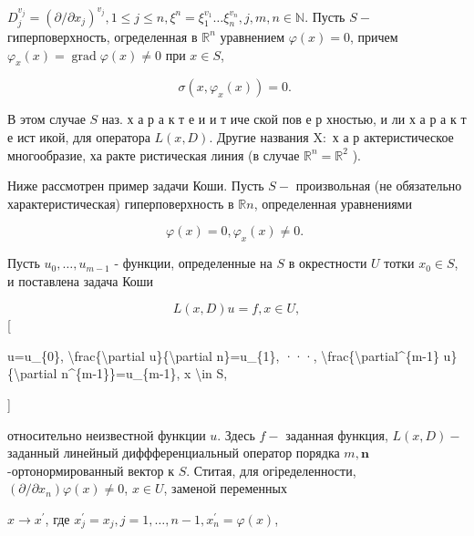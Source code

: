 \documentclass[10pt]{article}
\begin{document}
$D_{j}^{v_{j}}=\left(\partial / \partial x_{j}\right)^{v_{j}}, 1 \leqslant j \leqslant n, \xi^{n}=\xi_{1}^{v_{1}} \ldots \xi_{n}^{v_{n}}, j, m, n \in \mathbb{N}$. Пусть $S-$ гиперповерхность, огределенная в $\mathbb{R}^{n}$ уравнением $\varphi(x)=0$, причем $\varphi_{x}(x)=\operatorname{grad} \varphi(x) \neq 0$ при $x \in S$,



\[

\sigma\left(x, \varphi_{x}(x)\right)=0 \text {. }

\]



В этом случае $S$ наз. х а р а к т е и и т иче ской пов е р хностью, и ли х а р а к т е ист икой, для оператора $L(x, D)$. Другие названия $\mathrm{X}:$ х а р актеристическое многообразие, ха ракте ристическая линия (в случае $\mathbb{R}^{n}=\mathbb{R}^{2}$ ).



Ниже рассмотрен пример задачи Коши. Пусть $S-$ произвольная (не обязательно характеристическая) гиперповерхность в $\mathbb{R} n$, определенная уравнениями



\[

\varphi(x)=0, \varphi_{x}(x) \neq 0 \text {. }

\]



Пусть $u_{0}, \ldots, u_{m-1}$ - функции, определенные на $S$ в окрестности $U$ тотки $x_{0} \in S$, и поставлена задача Коши



\[

L(x, D) u=f, x \in U,

\][



u=u\_\{0\}, \textbackslash frac\{\textbackslash partial u\}\{\textbackslash partial n\}=u\_\{1\}, ···, \textbackslash frac\{\textbackslash partial\^{}\{m-1\} u\}\{\textbackslash partial n\^{}\{m-1\}\}=u\_\{m-1\}, x \textbackslash in S,

]



относительно неизвестной функции $u$. Здесь $f-$ заданная функция, $L(x, D)-$ заданный линейный диффференциальный оператор порядка $m, \boldsymbol{n}$-ортонормированный вектор к $S$. Ститая, для огіределенности, $\left(\partial / \partial x_{n}\right) \varphi(x) \neq 0$, $x \in U$, заменой переменных



$x \longrightarrow x^{\prime}$, где $x_{j}^{\prime}=x_{j}, j=1, \ldots, n-1, x_{n}^{\prime}=\varphi(x)$,
\end{document}
